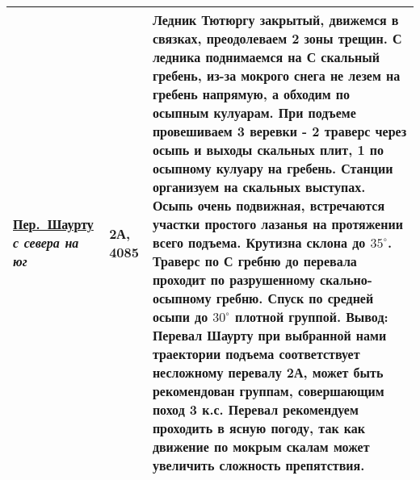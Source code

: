 {\begin{longtable}{|>{\centering\arraybackslash}m{3.8cm}|>{\centering\arraybackslash}m{1.3cm}|>{\raggedright\arraybackslash}m{12.5cm}|}
			\hyperref[subsec:Day12]{Пер.~Шаурту}																	\newline\textit{с севера на юг}			&	2А,	4085					&	Ледник Тютюргу закрытый, движемся в связках, преодолеваем 2 зоны трещин. С ледника поднимаемся на С скальный гребень, из-за мокрого снега не лезем на гребень напрямую, а обходим по осыпным кулуарам. При подъеме провешиваем 3 веревки - 2 траверс через осыпь и выходы скальных плит, 1 по осыпному кулуару на гребень. Станции организуем на скальных выступах. Осыпь очень подвижная, встречаются участки простого лазанья на протяжении всего подъема. Крутизна склона до $35^\circ$. Траверс по С гребню до перевала проходит по разрушенному скально-осыпному гребню. Спуск по средней осыпи до $30^\circ$ плотной группой. \newline \textbf{Вывод:} Перевал Шаурту при выбранной нами траектории подъема соответствует несложному перевалу 2А, может быть рекомендован группам, совершающим поход 3 к.с. Перевал рекомендуем проходить в ясную погоду, так как движение по мокрым скалам может увеличить сложность препятствия.																																																																																																																																																																																																																																																																															\\ \hline

\end{longtable}}

